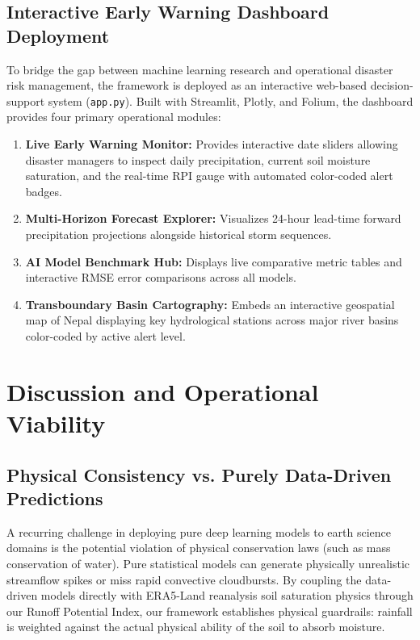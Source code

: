 \documentclass[journal]{IEEEtran}
\begin{document}
\subsection{Interactive Early Warning Dashboard Deployment}
To bridge the gap between machine learning research and operational disaster risk management, the framework is deployed as an interactive web-based decision-support system (\texttt{app.py}). Built with Streamlit, Plotly, and Folium, the dashboard provides four primary operational modules:
\begin{enumerate}
    \item \textbf{Live Early Warning Monitor:} Provides interactive date sliders allowing disaster managers to inspect daily precipitation, current soil moisture saturation, and the real-time RPI gauge with automated color-coded alert badges.
    \item \textbf{Multi-Horizon Forecast Explorer:} Visualizes 24-hour lead-time forward precipitation projections alongside historical storm sequences.
    \item \textbf{AI Model Benchmark Hub:} Displays live comparative metric tables and interactive RMSE error comparisons across all models.
    \item \textbf{Transboundary Basin Cartography:} Embeds an interactive geospatial map of Nepal displaying key hydrological stations across major river basins color-coded by active alert level.
\end{enumerate}

\section{Discussion and Operational Viability}

\subsection{Physical Consistency vs. Purely Data-Driven Predictions}
A recurring challenge in deploying pure deep learning models to earth science domains is the potential violation of physical conservation laws (such as mass conservation of water). Pure statistical models can generate physically unrealistic streamflow spikes or miss rapid convective cloudbursts. By coupling the data-driven models directly with ERA5-Land reanalysis soil saturation physics through our Runoff Potential Index, our framework establishes physical guardrails: rainfall is weighted against the actual physical ability of the soil to absorb moisture.
\end{document}
